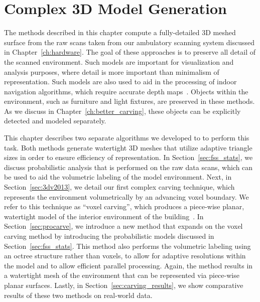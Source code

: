 \documentclass[12pt,onecolumn,oneside]{book}
\begin{document}

\chapter{Complex 3D Model Generation}
\label{ch:carving}

The methods described in this chapter compute a fully-detailed 3D meshed surface from the raw scans taken from our ambulatory scanning system discussed in Chapter~\ref{ch:hardware}.  The goal of these approaches is to preserve all detail of the scanned environment.  Such models are important for visualization and analysis purposes, where detail is more important than minimalism of representation.  Such models are also used to aid in the processing of indoor navigation algorithms, which require accurate depth maps~\cite{Liang13}.  Objects within the environment, such as furniture and light fixtures, are preserved in these methods.  As we discuss in Chapter~\ref{ch:better_carving}, these objects can be explicitly detected and modeled separately.

This chapter describes two separate algorithms we developed to to perform this task.  Both methods generate watertight 3D meshes that utilize adaptive triangle sizes in order to ensure efficiency of representation.  In Section~\ref{sec:fss_stats}, we discuss probabilistic analysis that is performed on the raw data scans, which can be used to aid the volumetric labeling of the model environment.  Next, in Section~\ref{sec:3dv2013}, we detail our first complex carving technique, which represents the environment volumetrically by an advancing voxel boundary.  We refer to this technique as ``voxel carving'', which produces a piece-wise planar, watertight model of the interior environment of the building~\cite{Turner13}.  In Section~\ref{sec:procarve}, we introduce a new method that expands on the voxel carving method by introducing the probabilistic models discussed in Section~\ref{sec:fss_stats}.  This method also performs the volumetric labeling using an octree structure rather than voxels, to allow for adaptive resolutions within the model and to allow efficient parallel processing.  Again, the method results in a watertight mesh of the environment that can be represented via piece-wise planar surfaces.  Lastly, in Section~\ref{sec:carving_results}, we show comparative results of these two methods on real-world data.
\end{document}
